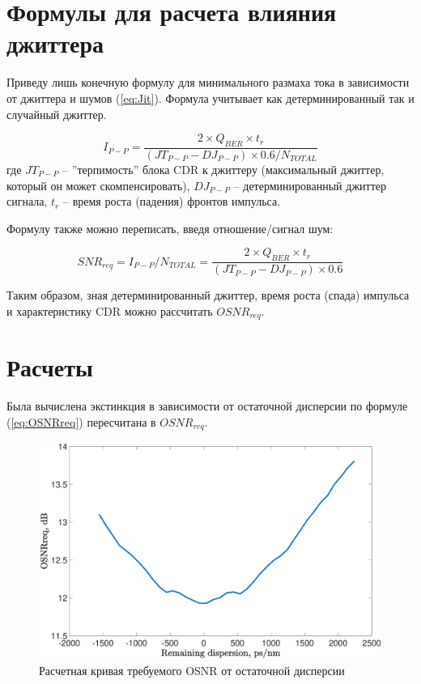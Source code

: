 \documentclass{article}
\begin{document}
\section{Формулы для расчета влияния джиттера}

Приведу лишь конечную формулу для минимального размаха тока в зависимости от джиттера и шумов (\ref{eq:Jit}). Формула учитывает как детерминированный так и случайный джиттер.

\begin{equation}
    I_{P-P}=\frac{2\times Q_{BER}\times t_r}{(JT_{P-P}-DJ_{P-P})\times0.6/N_{TOTAL}}
    \label{eq:Jit}
\end{equation}
где $JT_{P-P}$ -- ''терпимость'' блока CDR к джиттеру (максимальный джиттер, который он может скомпенсировать), $DJ_{P-P}$ -- детерминированный джиттер сигнала, $t_r$ -- время роста (падения) фронтов импульса.

Формулу также можно переписать, введя отношение/сигнал шум:

\begin{equation}
    SNR_{req}=I_{P-P}/N_{TOTAL}=\frac{2\times Q_{BER}\times t_r}{(JT_{P-P}-DJ_{P-P})\times0.6}
\end{equation}

Таким образом, зная детерминированный джиттер, время роста (спада) импульса и характеристику CDR можно рассчитать $OSNR_{req}$.

\section{Расчеты}
Была вычислена экстинкция в зависимости от остаточной дисперсии по формуле (\ref{eq:OSNRreq}) пересчитана в $OSNR_{req}$.
\begin{figure}[h]
	\center\includegraphics[width=0.8\linewidth]{OSNRreqVsRemDisp.eps}
	\caption{Расчетная кривая требуемого OSNR от остаточной дисперсии}
	\label{fig:ExpSetup}
\end{figure}
\end{document}
